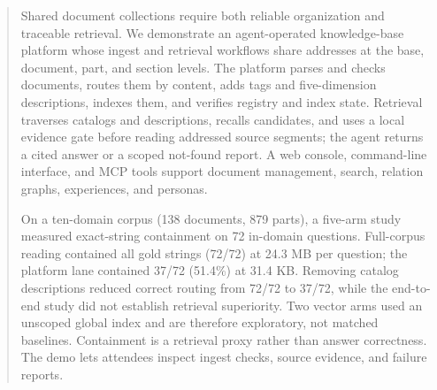\begin{abstract}
Shared document collections require both reliable organization and
traceable retrieval. We demonstrate an agent-operated knowledge-base
platform whose ingest and retrieval workflows share addresses at the
base, document, part, and section levels. The platform parses and checks
documents, routes them by content, adds tags and five-dimension
descriptions, indexes them, and verifies registry and index state.
Retrieval traverses catalogs and descriptions, recalls candidates, and
uses a local evidence gate before reading addressed source segments;
the agent returns a cited answer or a scoped not-found report. A web
console, command-line interface, and MCP tools support document
management, search, relation graphs, experiences, and personas.

On a ten-domain corpus (138 documents, 879 parts), a five-arm study
measured exact-string containment on 72 in-domain questions. Full-corpus
reading contained all gold strings (72/72) at 24.3 MB per question;
the platform lane contained 37/72 (51.4\%) at 31.4 KB. Removing
catalog descriptions reduced correct routing from 72/72 to 37/72, while
the end-to-end study did not establish retrieval superiority. Two vector
arms used an unscoped global index and are therefore exploratory, not
matched baselines. Containment is a retrieval proxy rather than answer
correctness. The demo lets attendees inspect ingest checks, source
evidence, and failure reports.
\end{abstract}
